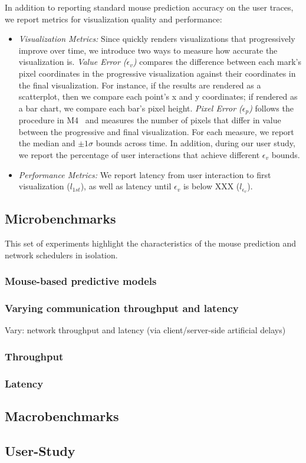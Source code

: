 In addition to reporting standard mouse prediction accuracy on the user traces, we report metrics for visualization quality and performance:

\begin{itemize}[leftmargin=*, topsep=0mm, itemsep=0mm]
  \item {\it Visualization Metrics: } Since \sys quickly renders visualizations that progressively improve over time, we introduce two ways to measure how accurate the visualization is.  {\it Value Error ($\epsilon_v$)} compares the difference between each mark's pixel coordinates in the progressive visualization against their coordinates in the final visualization.  For instance, if the results are rendered as a scatterplot, then we compare each point's x and y coordinates; if rendered as a bar chart, we compare each bar's pixel height.  {\it Pixel Error ($\epsilon_p$)} follows the procedure in M4~\cite{m4} and measures the number of pixels that differ in value between the progressive and final visualization.  For each measure, we report the median and $\pm 1\sigma$ bounds across time.  In addition, during our user study, we report the percentage of user interactions that achieve different $\epsilon_v$ bounds.

  \item {\it Performance Metrics: }  We report latency from user interaction to first visualization ($l_{1st}$), as well as latency until $\epsilon_v$ is below XXX ($l_{\epsilon_v}$).  
\end{itemize}

\subsection{Microbenchmarks}

This set of experiments highlight the characteristics of the mouse prediction and network schedulers in isolation.

\subsubsection{Mouse-based predictive models}

\subsubsection{Varying communication throughput and latency}
\label{sec:experiments:inc}

Vary: network throughput and latency (via client/server-side artificial delays)

\subsubsection{Throughput}

\subsubsection{Latency}


\subsection{Macrobenchmarks}

\subsection{User-Study}



